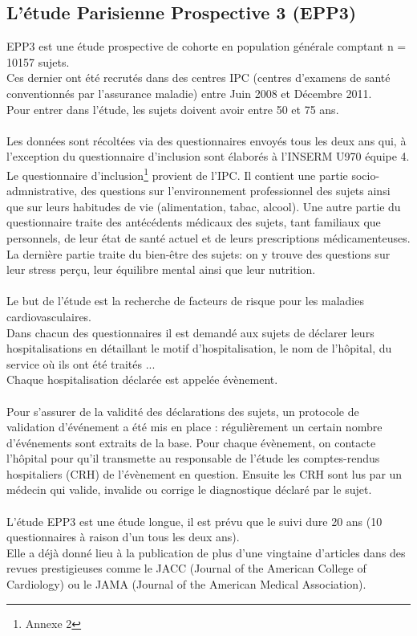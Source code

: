 \documentclass{book}
\begin{document}
\subsection{L'étude Parisienne Prospective 3 (EPP3)}
\noindent
EPP3 \cite{empana_paris_2011} est une étude prospective de cohorte en population générale comptant n = 10157 sujets.\\
Ces dernier ont été recrutés dans des centres IPC (centres d'examens de santé conventionnés par l'assurance maladie) entre Juin 2008 et Décembre 2011.\\
Pour entrer dans l'étude, les sujets doivent avoir entre 50 et 75 ans.\\
\\
Les données sont récoltées via des questionnaires envoyés tous les deux ans qui, à l'exception du questionnaire d'inclusion sont élaborés à l'INSERM U970 équipe 4. \\
Le questionnaire d'inclusion\footnote{Annexe 2} provient de l'IPC. Il contient une partie socio-admnistrative, des questions sur l'environnement professionnel des sujets ainsi que sur leurs habitudes de vie (alimentation, tabac, alcool). 
Une autre partie du questionnaire traite des antécédents médicaux des sujets, tant familiaux que personnels, de leur état de santé actuel et de leurs prescriptions médicamenteuses.
La dernière partie traite du bien-être des sujets: on y trouve des questions sur leur stress perçu, leur équilibre mental ainsi que leur nutrition.\\
\\
Le but de l'étude est la recherche de facteurs de risque pour les maladies cardiovasculaires.\\ 
Dans chacun des questionnaires il est demandé aux sujets de déclarer leurs hospitalisations en détaillant le motif d'hospitalisation, le nom de l'hôpital, du service où ils ont été traités ...\\
Chaque hospitalisation déclarée est appelée évènement.\\
\\
Pour s'assurer de la validité des déclarations des sujets, un protocole de validation d'événement a été mis en place : régulièrement un certain nombre d'événements sont extraits de la base. Pour chaque évènement, on contacte l'hôpital pour qu'il transmette au responsable de l'étude les comptes-rendus hospitaliers (CRH) de l'évènement en question. Ensuite les CRH sont lus par un médecin qui valide, invalide ou corrige le diagnostique déclaré par le sujet.\\
\\
L'étude EPP3 est une étude longue, il est prévu que le suivi dure 20 ans (10 questionnaires à raison d'un tous les deux ans).\\
Elle a déjà donné lieu à la publication de plus d'une vingtaine d'articles dans des revues prestigieuses comme le JACC (Journal of the American College of Cardiology) ou le JAMA (Journal of the American Medical Association).\\
\end{document}

